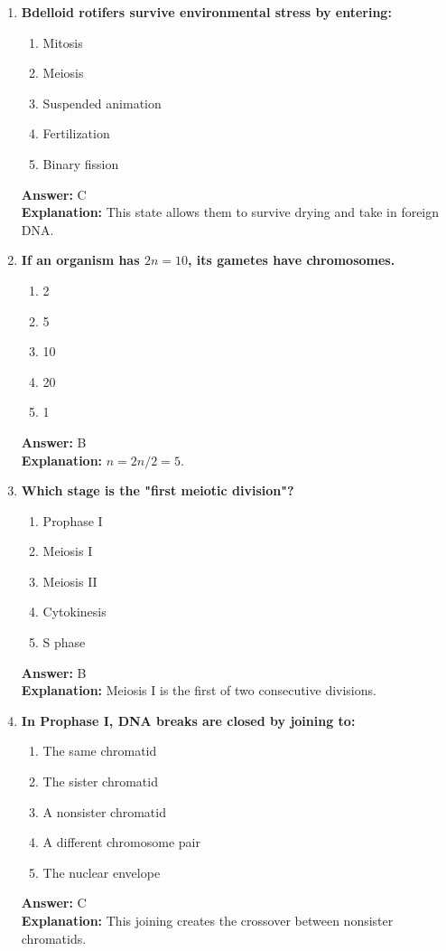 \documentclass[11pt, a4paper]{article}
\begin{document}
\begin{enumerate}[leftmargin=*, label=\arabic*.]
\item \textbf{Bdelloid rotifers survive environmental stress by entering:}
\begin{enumerate}[label=\Alph*.]
\item Mitosis
\item Meiosis
\item Suspended animation
\item Fertilization
\item Binary fission
\end{enumerate}
\textbf{Answer:} C \\
\textbf{Explanation:} This state allows them to survive drying and take in foreign DNA.

\item \textbf{If an organism has $2n = 10$, its gametes have \underline{\hspace{1cm}} chromosomes.}
\begin{enumerate}[label=\Alph*.]
\item 2
\item 5
\item 10
\item 20
\item 1
\end{enumerate}
\textbf{Answer:} B \\
\textbf{Explanation:} $n = 2n / 2 = 5$.

\item \textbf{Which stage is the "first meiotic division"?}
\begin{enumerate}[label=\Alph*.]
\item Prophase I
\item Meiosis I
\item Meiosis II
\item Cytokinesis
\item S phase
\end{enumerate}
\textbf{Answer:} B \\
\textbf{Explanation:} Meiosis I is the first of two consecutive divisions.

\item \textbf{In Prophase I, DNA breaks are closed by joining to:}
\begin{enumerate}[label=\Alph*.]
\item The same chromatid
\item The sister chromatid
\item A nonsister chromatid
\item A different chromosome pair
\item The nuclear envelope
\end{enumerate}
\textbf{Answer:} C \\
\textbf{Explanation:} This joining creates the crossover between nonsister chromatids.


\end{enumerate}
\end{document}
